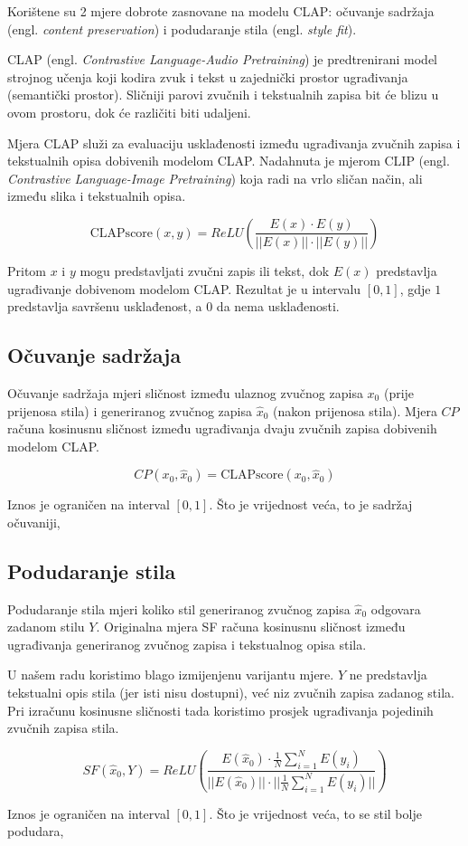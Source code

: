 Korištene su 2 mjere dobrote zasnovane na modelu CLAP: očuvanje sadržaja (engl. \textit{content preservation}) i podudaranje stila (engl. \textit{style fit}).

CLAP (engl. \textit{Contrastive Language-Audio Pretraining}) je predtrenirani model strojnog učenja koji kodira zvuk i tekst u zajednički prostor ugrađivanja (semantički prostor). Sličniji parovi zvučnih i tekstualnih zapisa bit će blizu u ovom prostoru, dok će različiti biti udaljeni. 

Mjera CLAP služi za evaluaciju usklađenosti između ugrađivanja zvučnih zapisa i tekstualnih opisa dobivenih modelom CLAP. Nadahnuta je mjerom CLIP (engl. \textit{Contrastive Language-Image Pretraining}) koja radi na vrlo sličan način, ali između slika i tekstualnih opisa. 

\begin{equation}
    \mathrm{CLAPscore}(x, y)  = ReLU\left(\frac{E(x)\cdot E(y)}{||E(x)||\cdot ||E(y)||}\right)
\end{equation}

Pritom $x$ i $y$ mogu predstavljati zvučni zapis ili tekst, dok $E(x)$ predstavlja ugrađivanje dobivenom modelom CLAP. Rezultat je u intervalu $[0, 1]$, gdje $1$ predstavlja savršenu usklađenost, a $0$ da nema usklađenosti.

\subsection{Očuvanje sadržaja}
Očuvanje sadržaja mjeri sličnost između ulaznog zvučnog zapisa $x_0$ (prije prijenosa stila) i generiranog zvučnog zapisa $\hat{x}_0$ (nakon prijenosa stila). Mjera $CP$ računa kosinusnu sličnost između ugrađivanja dvaju zvučnih zapisa dobivenih modelom CLAP.

\begin{equation}
    CP(x_0, \hat{x}_0) = \mathrm{CLAPscore}(x_0, \hat{x}_0)
\end{equation}

Iznos je ograničen na interval $[0,1]$. Što je vrijednost veća, to je sadržaj očuvaniji,


\subsection{Podudaranje stila}
Podudaranje stila mjeri koliko stil generiranog zvučnog zapisa $\hat{x}_0$ odgovara zadanom stilu $Y$. Originalna mjera SF računa kosinusnu sličnost između ugrađivanja generiranog zvučnog zapisa i tekstualnog opisa stila.

U našem radu koristimo blago izmijenjenu varijantu mjere. $Y$ ne predstavlja tekstualni opis stila (jer isti nisu dostupni), već niz zvučnih zapisa zadanog stila. Pri izračunu kosinusne sličnosti tada koristimo prosjek ugrađivanja pojedinih zvučnih zapisa stila. 

\begin{equation}
    SF(\hat{x}_0, Y)  = ReLU\left(\frac{E(\hat{x}_0)\cdot \frac{1}{N}\sum_{i=1}^NE(y_i)}{||E(\hat{x}_0)||\cdot ||\frac{1}{N}\sum_{i=1}^NE(y_i)||}\right)
\end{equation}

Iznos je ograničen na interval $[0,1]$. Što je vrijednost veća, to se stil bolje podudara,


